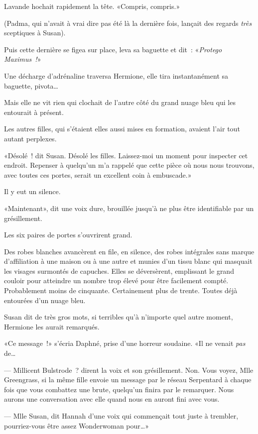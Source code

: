 Lavande hochait rapidement la tête. «Compris, compris.»

(Padma, qui n'avait à vrai dire pas été là la dernière fois, lançait des regards \emph{très} sceptiques à Susan).

Puis cette dernière se figea sur place, leva sa baguette et dit~: «\emph{Protego Maximus~!}»

Une décharge d'adrénaline traversa Hermione, elle tira instantanément sa baguette, pivota…

Mais elle ne vit rien qui clochait de l'autre côté du grand nuage bleu qui les entourait à présent.

Les autres filles, qui s'étaient elles aussi mises en formation, avaient l'air tout autant perplexes.

«Désolé~! dit Susan. Désolé les filles. Laissez-moi un moment pour inspecter cet endroit. Repenser à quelqu'un m'a rappelé que cette pièce où nous nous trouvons, avec toutes ces portes, serait un excellent coin à embuscade.»

Il y eut un silence.

«Maintenant», dit une voix dure, brouillée jusqu'à ne plus être identifiable par un grésillement.

Les six paires de portes s'ouvrirent grand.

Des robes blanches avancèrent en file, en silence, des robes intégrales sans marque d'affiliation à une maison ou à une autre et munies d'un tissu blanc qui masquait les visages surmontés de capuches. Elles se déversèrent, emplissant le grand couloir pour atteindre un nombre trop élevé pour être facilement compté. Probablement moins de cinquante. Certainement plus de trente. Toutes déjà entourées d'un nuage bleu.

Susan dit de très gros mots, si terribles qu'à n'importe quel autre moment, Hermione les aurait remarqués.

«Ce message~!» s'écria Daphné, prise d'une horreur soudaine. «Il ne venait \emph{pas} de…

--- Millicent Bulstrode~? dirent la voix et son grésillement. Non. Vous voyez, Mlle Greengrass, si la même fille envoie un message par le réseau Serpentard à chaque fois que vous combattez une brute, quelqu'un finira par le remarquer. Nous aurons une conversation avec elle quand nous en auront fini avec vous.

--- Mlle Susan, dit Hannah d'une voix qui commençait tout juste à trembler, pourriez-vous être assez Wonderwoman pour…»

